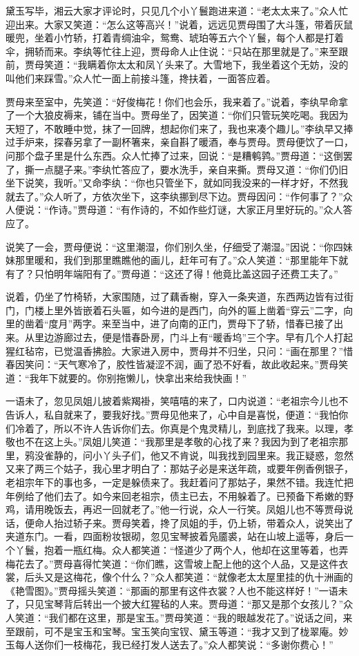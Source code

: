 \documentclass[12pt,oneside]{book}
\begin{document}
黛玉写毕，湘云大家才评论时，只见几个小丫鬟跑进来道：“老太太来了。”众人忙迎出来。大家又笑道：“怎么这等高兴！”说着，远远见贾母围了大斗篷，带着灰鼠暖兜，坐着小竹轿，打着青绸油伞，鸳鸯、琥珀等五六个丫鬟，每个人都是打着伞，拥轿而来。李纨等忙往上迎，贾母命人止住说：“只站在那里就是了。”来至跟前，贾母笑道：“我瞒着你太太和凤丫头来了。大雪地下，我坐着这个无妨，没的叫他们来踩雪。”众人忙一面上前接斗篷，搀扶着，一面答应着。

贾母来至室中，先笑道：“好俊梅花！你们也会乐，我来着了。”说着，李纨早命拿了一个大狼皮褥来，铺在当中。贾母坐了，因笑道：“你们只管玩笑吃喝。我因为天短了，不敢睡中觉，抹了一回牌，想起你们来了，我也来凑个趣儿。”李纨早又捧过手炉来，探春另拿了一副杯箸来，亲自斟了暖酒，奉与贾母。贾母便饮了一口，问那个盘子里是什么东西。众人忙捧了过来，回说：“是糟鹌鹑。”贾母道：“这倒罢了，撕一点腿子来。”李纨忙答应了，要水洗手，亲自来撕。贾母又道：“你们仍旧坐下说笑，我听。”又命李纨：“你也只管坐下，就如同我没来的一样才好，不然我就去了。”众人听了，方依次坐下，这李纨挪到尽下边。贾母因问：“作何事了？”众人便说：“作诗。”贾母道：“有作诗的，不如作些灯谜，大家正月里好玩的。”众人答应了。

说笑了一会，贾母便说：“这里潮湿，你们别久坐，仔细受了潮湿。”因说：“你四妹妹那里暖和，我们到那里瞧瞧他的画儿，赶年可有了。”众人笑道：“那里能年下就有了？只怕明年端阳有了。”贾母道：“这还了得！他竟比盖这园子还费工夫了。”

说着，仍坐了竹椅轿，大家围随，过了藕香榭，穿入一条夹道，东西两边皆有过街门，门楼上里外皆嵌着石头匾，如今进的是西门，向外的匾上凿着“穿云”二字，向里的凿着“度月”两字。来至当中，进了向南的正门，贾母下了轿，惜春已接了出来。从里边游廊过去，便是惜春卧房，门斗上有“暖香坞”三个字。早有几个人打起猩红毡帘，已觉温香拂脸。大家进入房中，贾母并不归坐，只问：“画在那里？”惜春因笑问：“天气寒冷了，胶性皆凝涩不润，画了恐不好看，故此收起来。”贾母笑道：“我年下就要的。你别拖懒儿，快拿出来给我快画！”

一语未了，忽见凤姐儿披着紫羯褂，笑嘻嘻的来了，口内说道：“老祖宗今儿也不告诉人，私自就来了，要我好找。”贾母见他来了，心中自是喜悦，便道：“我怕你们冷着了，所以不许人告诉你们去。你真是个鬼灵精儿，到底找了我来。以理，孝敬也不在这上头。”凤姐儿笑道：“我那里是孝敬的心找了来？我因为到了老祖宗那里，鸦没雀静的，问小丫头子们，他又不肯说，叫我找到园里来。我正疑惑，忽然又来了两三个姑子，我心里才明白了：那姑子必是来送年疏，或要年例香例银子，老祖宗年下的事也多，一定是躲债来了。我赶着问了那姑子，果然不错。我连忙把年例给了他们去了。如今来回老祖宗，债主已去，不用躲着了。已预备下希嫩的野鸡，请用晚饭去，再迟一回就老了。”他一行说，众人一行笑。凤姐儿也不等贾母说话，便命人抬过轿子来。贾母笑着，搀了凤姐的手，仍上轿，带着众人，说笑出了夹道东门。一看，四面粉妆银砌，忽见宝琴披着凫靥裘，站在山坡上遥等，身后一个丫鬟，抱着一瓶红梅。众人都笑道：“怪道少了两个人，他却在这里等着，也弄梅花去了。”贾母喜得忙笑道：“你们瞧，这雪坡上配上他的这个人品，又是这件衣裳，后头又是这梅花，像个什么？”众人都笑道：“就像老太太屋里挂的仇十洲画的《艳雪图》。”贾母摇头笑道：“那画的那里有这件衣裳？人也不能这样好！”一语未了，只见宝琴背后转出一个披大红猩毡的人来。贾母道：“那又是那个女孩儿？”众人笑道：“我们都在这里，那是宝玉。”贾母笑道：“我的眼越发花了。”说话之间，来至跟前，可不是宝玉和宝琴。宝玉笑向宝钗、黛玉等道：“我才又到了栊翠庵。妙玉每人送你们一枝梅花，我已经打发人送去了。”众人都笑说：“多谢你费心！”
\end{document}
